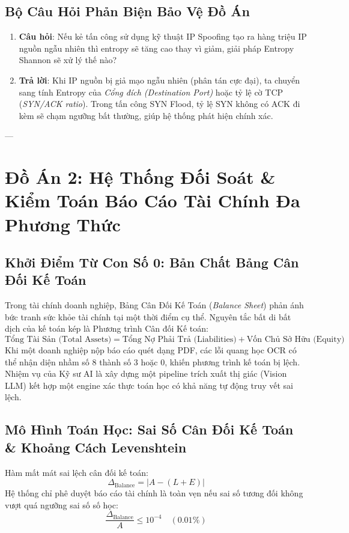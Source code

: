 \subsection{Bộ Câu Hỏi Phản Biện Bảo Vệ Đồ Án}
\begin{enumerate}
  \item \textbf{Câu hỏi}: Nếu kẻ tấn công sử dụng kỹ thuật IP Spoofing tạo ra hàng triệu IP nguồn ngẫu nhiên thì entropy sẽ tăng cao thay vì giảm, giải pháp Entropy Shannon sẽ xử lý thế nào?
  \item \textbf{Trả lời}: Khi IP nguồn bị giả mạo ngẫu nhiên (phân tán cực đại), ta chuyển sang tính Entropy của \textit{Cổng đích (Destination Port)} hoặc tỷ lệ cờ TCP (\textit{SYN/ACK ratio}). Trong tấn công SYN Flood, tỷ lệ SYN không có ACK đi kèm sẽ chạm ngưỡng bất thường, giúp hệ thống phát hiện chính xác.
\end{enumerate}

---

\section{Đồ Án 2: Hệ Thống Đối Soát \& Kiểm Toán Báo Cáo Tài Chính Đa Phương Thức}
\label{sec:workbook-multimodal-auditor}

\subsection{Khởi Điểm Từ Con Số 0: Bản Chất Bảng Cân Đối Kế Toán}
Trong tài chính doanh nghiệp, Bảng Cân Đối Kế Toán (\textit{Balance Sheet}) phản ánh bức tranh sức khỏe tài chính tại một thời điểm cụ thể. Nguyên tắc bất di bất dịch của kế toán kép là Phương trình Cân đối Kế toán:
\begin{equation}
\text{Tổng Tài Sản (Total Assets)} = \text{Tổng Nợ Phải Trả (Liabilities)} + \text{Vốn Chủ Sở Hữu (Equity)}
\end{equation}
Khi một doanh nghiệp nộp báo cáo quét dạng PDF, các lỗi quang học OCR có thể nhận diện nhầm số $8$ thành số $3$ hoặc $0$, khiến phương trình kế toán bị lệch. Nhiệm vụ của Kỹ sư AI là xây dựng một pipeline trích xuất thị giác (Vision LLM) kết hợp một engine xác thực toán học có khả năng tự động truy vết sai lệch.

\subsection{Mô Hình Toán Học: Sai Số Cân Đối Kế Toán \& Khoảng Cách Levenshtein}
Hàm mất mát sai lệch cân đối kế toán:
\begin{equation}
\Delta_{\text{Balance}} = \left| A - (L + E) \right|
\end{equation}
Hệ thống chỉ phê duyệt báo cáo tài chính là toàn vẹn nếu sai số tương đối không vượt quá ngưỡng sai số số học:
\begin{equation}
\frac{\Delta_{\text{Balance}}}{A} \le 10^{-4} \quad (0.01\%)
\end{equation}

